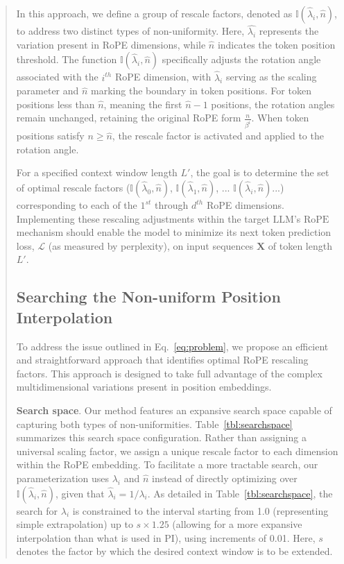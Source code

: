 \begin{abstract}
In this approach, we define a group of rescale factors, denoted as $\mathbb{I}(\hat{\lambda}_{i},\hat{n})$, to address two distinct types of non-uniformity. Here, $\hat{\lambda_i}$ represents the variation present in RoPE dimensions, while $\hat{n}$ indicates the token position threshold. The function $\mathbb{I}(\hat{\lambda}_{i},\hat{n})$ specifically adjusts the rotation angle associated with the $i^{th}$ RoPE dimension, with $\hat{\lambda}_i$ serving as the scaling parameter and $\hat{n}$ marking the boundary in token positions. For token positions less than $\hat{n}$, meaning the first $\hat{n}-1$ positions, the rotation angles remain unchanged, retaining the original RoPE form $\frac{n}{\beta^i}$. When token positions satisfy $n \ge \hat{n}$, the rescale factor is activated and applied to the rotation angle.

For a specified context window length $L'$, the goal is to determine the set of optimal rescale factors ($\mathbb{I}(\hat{\lambda}_{0},\hat{n})$, $\mathbb{I}(\hat{\lambda}_{1},\hat{n})$, ... $\mathbb{I}(\hat{\lambda}_{i},\hat{n})$...) corresponding to each of the $1^{st}$ through $d^{th}$ RoPE dimensions. Implementing these rescaling adjustments within the target $\text{LLM}$’s $\text{RoPE}$ mechanism should enable the model to minimize its next token prediction loss, $\mathcal{L}$ (as measured by perplexity), on input sequences $\mathbf{X}$ of token length $L'$.

\subsection{Searching the Non-uniform Position Interpolation}

To address the issue outlined in Eq.~\ref{eq:problem}, we propose an efficient and straightforward approach that identifies optimal RoPE rescaling factors. This approach is designed to take full advantage of the complex multidimensional variations present in position embeddings.

\textbf{Search space}. Our method features an expansive search space capable of capturing both types of non-uniformities. Table~\ref{tbl:searchspace} summarizes this search space configuration. Rather than assigning a universal scaling factor, we assign a unique rescale factor to each dimension within the RoPE embedding. To facilitate a more tractable search, our parameterization uses $\lambda_i$ and $\hat{n}$ instead of directly optimizing over $\mathbb{I}(\hat{\lambda}_{i},\hat{n})$, given that $\hat{\lambda}_{i}=1/\lambda_i$. As detailed in Table~\ref{tbl:searchspace}, the search for $\lambda_i$ is constrained to the interval starting from 1.0 (representing simple extrapolation) up to $s\times1.25$ (allowing for a more expansive interpolation than what is used in PI), using increments of 0.01. Here, $s$ denotes the factor by which the desired context window is to be extended.


\end{abstract}
